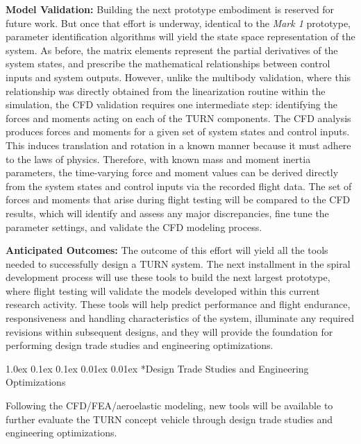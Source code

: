 \documentclass[11pt]{article}
\makeatletter
\renewcommand\subsection{
\@startsection{subsection}{2}{\z@}%
{1.0ex \@plus 0.1ex \@minus 0.1ex}%
{0.01ex \@plus 0.01ex}%
{\normalfont\Large\bfseries}}
\makeatother
\begin{document}
{\bf Model Validation:}
Building the next prototype embodiment is reserved for future work.  But once that effort is underway, identical to the \emph{Mark 1} prototype, parameter identification algorithms will yield the state space representation of the system.  As before, the matrix elements represent the partial derivatives of the system states, and prescribe the mathematical relationships between control inputs and system outputs.  However, unlike the multibody validation, where this relationship was directly obtained from the linearization routine within the simulation, the CFD validation requires one intermediate step: identifying the forces and moments acting on each of the TURN components.  The CFD analysis produces forces and moments for a given set of system states and control inputs.  This induces translation and rotation in a known manner because it must adhere to the laws of physics.  Therefore, with known mass and moment inertia parameters, the time-varying force and moment values can be derived directly from the system states and control inputs via the recorded flight data.  The set of forces and moments that arise during flight testing will be compared to the CFD results, which will identify and assess any major discrepancies, fine tune the parameter settings, and validate the CFD modeling process.


{\bf Anticipated Outcomes:}
The outcome of this effort will yield all the tools needed to successfully design a TURN system.  The next installment in the spiral development process will use these tools to build the next largest prototype, where flight testing will validate the models developed within this current research activity.  These tools will help predict performance and flight endurance, responsiveness and handling characteristics of the system, illuminate any required revisions within subsequent designs, and they will provide the foundation for performing design trade studies and engineering optimizations.




\subsection*{Design Trade Studies and Engineering Optimizations}

Following the CFD/FEA/aeroelastic modeling, new tools will be available to further evaluate the TURN concept vehicle through design trade studies and engineering optimizations.
\end{document}
